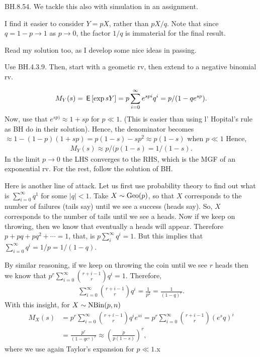 \begin{exercise}
BH.8.54.  We tackle this also with simulation in an assignment.

I find it easier to consider $Y=pX$, rather than $pX/q$. Note that since $q=1-p\to 1$ as $p\to 0$, the factor $1/q$ is immaterial for the final result.

Read my solution too, as I develop some nice ideas in passing.

\begin{hint}
Use BH.4.3.9. Then, start with a geometic rv, then extend to a negative binomial rv.
\end{hint}
\begin{solution}
\begin{align*}
M_{Y}(s) =\,\mathsf{E}\left[\exp{s Y}\right] = p \sum_{i=0}^{\infty} e^{s p i} q^{i} = p/(1-qe^{sp}).
\end{align*}
Now, use that $e^{s p)} \approx 1 + s p$ for $p\ll 1$. (This is easier than using l' Hopital's rule as BH do in their solution). Hence, the denominator becomes $\approx 1-(1-p)(1+sp) = p(1-s) - sp^{2} \approx p(1-s)$ when $p\ll 1$ Hence,
\begin{align*}
M_{Y}(s) \approx p/(p(1-s) =  1/(1-s).
\end{align*}
In the limit $p\to 0$ the LHS converges to the RHS, which is the MGF of an exponential rv. For the rest, follow the solution of BH.

Here is another line of attack. Let us first use probability theory to find out what is $\sum_{i=0}^{\infty} q^{1}$ for some $|q|<1$. Take $X\sim\mathrm{Geo}(p)$, so that $X$ corresponds to the number of failures (tails say) until we see a success (heads say). So, $X$ corresponds to the number of tails until we see a heads. Now if we keep on throwing, then we know that eventually a heads will appear. Therefore $p + pq +pq^2 + \cdots = 1$, that, is $p\sum_i^{\infty} q^{i}=1$. But this implies that $\sum_{i=0}^{\infty}q^i = 1/ p = 1/(1-q)$.

By similar reasoning, if we keep on throwing the coin until we see $r$ heads then we know that $p^r \sum_{i=0}^{\infty} {r+i-1 \choose r} q^{i} = 1$.  Therefore,
\begin{align*}
\sum_{i=0}^{\infty} {r+i-1 \choose r} q^{i} =  \frac{1}{p^{2}}= \frac{1}{(1-q)^{r}}.
\end{align*}
With this insight, for $X\sim\mathrm{NBin}(p,n)$
\begin{align*}
  M_X(s) &= p^r \sum_{i=0}^{\infty} {r+i-1 \choose r} q^{i} e^{si}
 = p^r \sum_{i=0}^{\infty} {r+i-1 \choose r} (e^{s}q)^{i} \\
  &= \frac{p^r}{(1-qe^{s})^{r}} \approx \left(\frac{p}{p(1-s)}\right)^{r},
\end{align*}
where we use again Taylor's expansion for $p\ll 1$.x
\end{solution}
\end{exercise}




